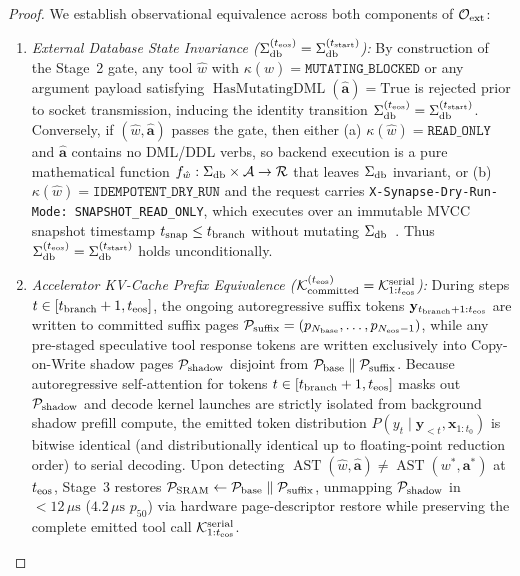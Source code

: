 \documentclass[10pt,conference]{IEEEtran}
\begin{document}
\begin{proof}
We establish observational equivalence across both components of $\mathcal{O}_{\textnormal{ext}}$:
\begin{enumerate}
    \item \emph{External Database State Invariance ($\Sigma_{\textnormal{db}}^{(t_{\textnormal{eos}})} = \Sigma_{\textnormal{db}}^{(t_{\textnormal{start}})}$):} By construction of the Stage~2 gate, any tool $\hat{w}$ with $\kappa(\hat{w}) = \texttt{MUTATING\_BLOCKED}$ or any argument payload satisfying $\operatorname{HasMutatingDML}(\hat{\mathbf{a}}) = \text{True}$ is rejected prior to socket transmission, inducing the identity transition $\Sigma_{\textnormal{db}}^{(t_{\textnormal{eos}})} = \Sigma_{\textnormal{db}}^{(t_{\textnormal{start}})}$. Conversely, if $(\hat{w}, \hat{\mathbf{a}})$ passes the gate, then either (a) $\kappa(\hat{w}) = \texttt{READ\_ONLY}$ and $\hat{\mathbf{a}}$ contains no DML/DDL verbs, so backend execution is a pure mathematical function $f_{\hat{w}}: \Sigma_{\textnormal{db}} \times \mathcal{A} \to \mathcal{R}$ that leaves $\Sigma_{\textnormal{db}}$ invariant, or (b) $\kappa(\hat{w}) = \texttt{IDEMPOTENT\_DRY\_RUN}$ and the request carries \texttt{X-Synapse-Dry-Run-Mode: SNAPSHOT\_READ\_ONLY}, which executes over an immutable MVCC snapshot timestamp $t_{\textnormal{snap}} \le t_{\textnormal{branch}}$ without mutating $\Sigma_{\textnormal{db}}$~\cite{corbett2012spanner}. Thus $\Sigma_{\textnormal{db}}^{(t_{\textnormal{eos}})} = \Sigma_{\textnormal{db}}^{(t_{\textnormal{start}})}$ holds unconditionally.
    \item \emph{Accelerator KV-Cache Prefix Equivalence ($\mathcal{K}_{\textnormal{committed}}^{(t_{\textnormal{eos}})} = \mathcal{K}_{1:t_{\textnormal{eos}}}^{\textnormal{serial}}$):} During steps $t \in [t_{\textnormal{branch}}+1, t_{\textnormal{eos}}]$, the ongoing autoregressive suffix tokens $\mathbf{y}_{t_{\textnormal{branch}}+1 : t_{\textnormal{eos}}}$ are written to committed suffix pages $\mathcal{P}_{\textnormal{suffix}} = (p_{N_{\textnormal{base}}}, \dots, p_{N_{\textnormal{eos}}-1})$, while any pre-staged speculative tool response tokens are written exclusively into Copy-on-Write shadow pages $\mathcal{P}_{\textnormal{shadow}}$ disjoint from $\mathcal{P}_{\textnormal{base}} \parallel \mathcal{P}_{\textnormal{suffix}}$. Because autoregressive self-attention for tokens $t \in [t_{\textnormal{branch}}+1, t_{\textnormal{eos}}]$ masks out $\mathcal{P}_{\textnormal{shadow}}$ and decode kernel launches are strictly isolated from background shadow prefill compute, the emitted token distribution $P(y_t \mid \mathbf{y}_{<t}, \mathbf{x}_{1:t_0})$ is bitwise identical (and distributionally identical up to floating-point reduction order) to serial decoding. Upon detecting $\operatorname{AST}(\hat{w}, \hat{\mathbf{a}}) \neq \operatorname{AST}(w^*, \mathbf{a}^*)$ at $t_{\textnormal{eos}}$, Stage~3 restores $\mathcal{P}_{\textnormal{SRAM}} \leftarrow \mathcal{P}_{\textnormal{base}} \parallel \mathcal{P}_{\textnormal{suffix}}$, unmapping $\mathcal{P}_{\textnormal{shadow}}$ in $< 12\,\mu\text{s}$ ($4.2\,\mu\text{s}$ $p_{50}$) via hardware page-descriptor restore while preserving the complete emitted tool call $\mathcal{K}_{1:t_{\textnormal{eos}}}^{\textnormal{serial}}$.

\end{enumerate}
\end{proof}
\end{document}
